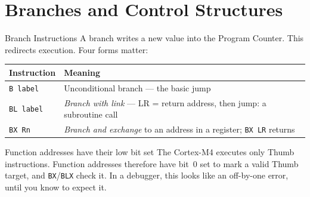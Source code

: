 \documentclass[9pt,aspectratio=169,xcolor=table]{beamer}
\newcommand{\striped}{\rowcolors{1}{white}{stripe}}
\begin{document}
\section{Branches and Control Structures}

\begin{frame}{Branch Instructions}
    A branch writes a new value into the Program Counter. This redirects execution. Four forms matter:

    \vspace{2mm}
    \begin{center}
    {\normalsize
    \striped
    \begin{tabular}{@{}l l@{}}
        \toprule
        \textbf{Instruction} & \textbf{Meaning} \\
        \midrule
        \texttt{B label}   & Unconditional branch --- the basic jump \\
        \texttt{BL label}  & \emph{Branch with link} --- LR = return address, then jump: a subroutine call \\
        \texttt{BX Rn}     & \emph{Branch and exchange} to an address in a register; \texttt{BX LR} returns \\
        \bottomrule
    \end{tabular}}
    \end{center}

    \vspace{3mm}
    \begin{block}{Function addresses have their low bit set}
        The Cortex-M4 executes only Thumb instructions. \alert{Function
        addresses therefore have bit~0 set} to mark a valid Thumb
        target, and \texttt{BX}/\texttt{BLX} check it. In a debugger,
        this looks like an off-by-one error, until you know to expect
        it.
    \end{block}
\end{frame}
\end{document}
